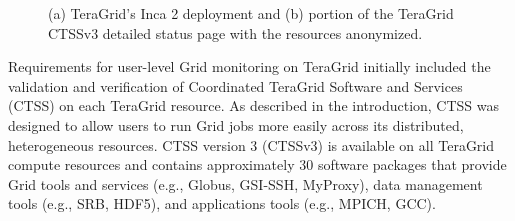 \documentclass[times,10pt,twocolumn]{article}
\begin{document}
\begin{figure}[tbp]
  \caption{\label{tg_deploy_fig}\label{status_page_fig} (a) TeraGrid's Inca 2
  deployment and (b) portion of the TeraGrid CTSSv3 detailed status page with
  the resources anonymized.}
\end{figure}

Requirements for user-level Grid monitoring on TeraGrid initially included the
validation and verification of Coordinated TeraGrid Software and Services (CTSS) 
on each TeraGrid resource.  As described in the introduction, CTSS was designed to
allow users to run Grid jobs more easily across its distributed, heterogeneous
resources.  CTSS version 3 (CTSSv3) is available on all TeraGrid compute
resources and contains approximately 30 software packages that provide
Grid tools and services (e.g., Globus, GSI-SSH, MyProxy), data management
tools (e.g., SRB, HDF5), and applications tools (e.g., MPICH, GCC).
\end{document}
